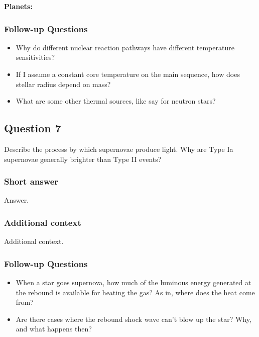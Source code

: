 \documentclass[a4paper,10pt]{article}
\begin{document}
{\noindent}\textbf{Planets:}

\subsubsection{Follow-up Questions}

\begin{itemize}
    \item Why do different nuclear reaction pathways have different temperature sensitivities?
    \item If I assume a constant core temperature on the main sequence, how does stellar radius depend on mass?
    \item What are some other thermal sources, like say for neutron stars?
\end{itemize}


\newpage
\subsection{Question 7}

Describe the process by which supernovae produce light. Why are Type Ia supernovae generally brighter than Type II events?

\subsubsection{Short answer}

Answer.

\subsubsection{Additional context}

Additional context.

\subsubsection{Follow-up Questions}

\begin{itemize}
    \item When a star goes supernova, how much of the luminous energy generated at the rebound is available for heating the gas? As in, where does the heat come from?
    \item Are there cases where the rebound shock wave can't blow up the star? Why, and what happens then?
\end{itemize}
\end{document}
